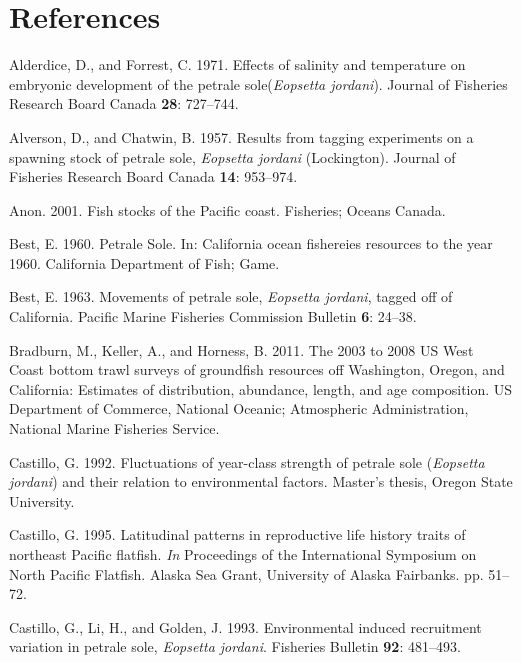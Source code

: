 \documentclass[12pt,]{article}
\begin{document}
\section{References}\label{references}

\hypertarget{refs}{}
\hypertarget{ref-alderdice_effects_1971}{}
Alderdice, D., and Forrest, C. 1971. Effects of salinity and temperature
on embryonic development of the petrale sole(\emph{Eopsetta jordani}).
Journal of Fisheries Research Board Canada \textbf{28}: 727--744.

\hypertarget{ref-alverson_results_1957}{}
Alverson, D., and Chatwin, B. 1957. Results from tagging experiments on
a spawning stock of petrale sole, \emph{Eopsetta jordani} (Lockington).
Journal of Fisheries Research Board Canada \textbf{14}: 953--974.

\hypertarget{ref-anon_fish_2001}{}
Anon. 2001. Fish stocks of the Pacific coast. Fisheries; Oceans Canada.

\hypertarget{ref-best_petrale_1960}{}
Best, E. 1960. Petrale Sole. In: California ocean fishereies resources
to the year 1960. California Department of Fish; Game.

\hypertarget{ref-best_e.a._movements_1963}{}
Best, E. 1963. Movements of petrale sole, \emph{Eopsetta jordani},
tagged off of California. Pacific Marine Fisheries Commission Bulletin
\textbf{6}: 24--38.

\hypertarget{ref-bradburn_2003_2011}{}
Bradburn, M., Keller, A., and Horness, B. 2011. The 2003 to 2008 US West
Coast bottom trawl surveys of groundfish resources off Washington,
Oregon, and California: Estimates of distribution, abundance, length,
and age composition. US Department of Commerce, National Oceanic;
Atmospheric Administration, National Marine Fisheries Service.

\hypertarget{ref-castillo_g.c._fluctuations_1992}{}
Castillo, G. 1992. Fluctuations of year-class strength of petrale sole
(\emph{Eopsetta jordani}) and their relation to environmental factors.
Master's thesis, Oregon State University.

\hypertarget{ref-castillo_latitudinal_1995}{}
Castillo, G. 1995. Latitudinal patterns in reproductive life history
traits of northeast Pacific flatfish. \emph{In} Proceedings of the
International Symposium on North Pacific Flatfish. Alaska Sea Grant,
University of Alaska Fairbanks. pp. 51--72.

\hypertarget{ref-castillo_g.c._environmental_1993}{}
Castillo, G., Li, H., and Golden, J. 1993. Environmental induced
recruitment variation in petrale sole, \emph{Eopsetta jordani}.
Fisheries Bulletin \textbf{92}: 481--493.
\end{document}
